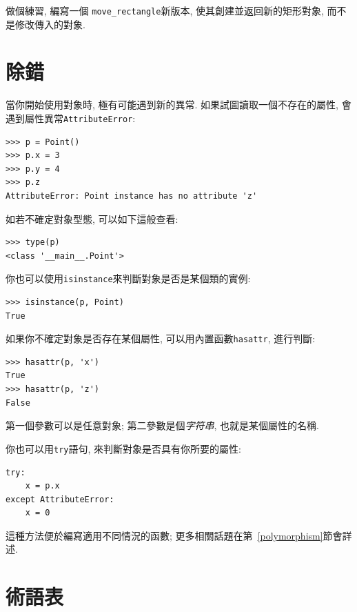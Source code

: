 \documentclass[10pt]{book}
\begin{document}
做個練習, 編寫一個 \verb"move_rectangle"新版本, 
使其創建並返回新的矩形對象, 而不是修改傳入的對象. 

\section{除錯}
\label{hasattr}

當你開始使用對象時, 極有可能遇到新的異常. 
如果試圖讀取一個不存在的屬性, 會遇到屬性異常{\tt AttributeError}:

\begin{verbatim}
>>> p = Point()
>>> p.x = 3
>>> p.y = 4
>>> p.z
AttributeError: Point instance has no attribute 'z'
\end{verbatim}
%
如若不確定對象型態, 可以如下這般查看:

\begin{verbatim}
>>> type(p)
<class '__main__.Point'>
\end{verbatim}
%
你也可以使用{\tt isinstance}來判斷對象是否是某個類的實例:

\begin{verbatim}
>>> isinstance(p, Point)
True
\end{verbatim}
%
如果你不確定對象是否存在某個屬性, 
可以用內置函數{\tt hasattr}, 進行判斷:

\begin{verbatim}
>>> hasattr(p, 'x')
True
>>> hasattr(p, 'z')
False
\end{verbatim}
%
第一個參數可以是任意對象;
第二參數是個{\em 字符串}, 也就是某個屬性的名稱. 

你也可以用{\tt try}語句, 來判斷對象是否具有你所要的屬性:

\begin{verbatim}
try:
    x = p.x
except AttributeError:
    x = 0
\end{verbatim}

這種方法便於編寫適用不同情況的函數;
更多相關話題在第~\ref{polymorphism}節會詳述. 


\section{術語表}
\end{document}

